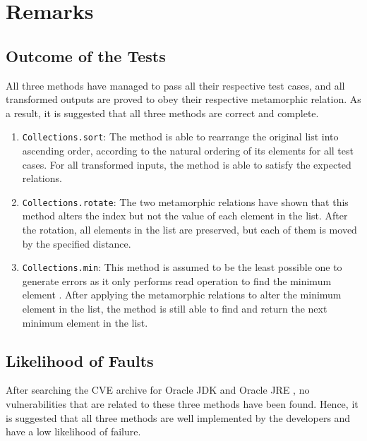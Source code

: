 \documentclass[12pt, a4paper]{article}
\begin{document}
\section{Remarks}
\subsection{Outcome of the Tests}
All three methods have managed to pass all their respective test cases, and all transformed outputs
are proved to obey their respective metamorphic relation. As a result, it is suggested that all
three methods are correct and complete.

\begin{enumerate}
  \item \texttt{Collections.sort}: The method is able to rearrange the original list into ascending
  order, according to the natural ordering of its elements for all test cases. For all transformed
  inputs, the method is able to satisfy the expected relations.

  \item \texttt{Collections.rotate}: The two metamorphic relations have shown that this method
  alters the index but not the value of each element in the list. After the rotation, all elements
  in the list are preserved, but each of them is moved by the specified distance.

  \item \texttt{Collections.min}: This method is assumed to be the least possible one to generate
  errors as it only performs read operation to find the minimum element \cite{collection_min}. After
  applying the metamorphic relations to alter the minimum element in the list, the method is still
  able to find and return the next minimum element in the list.
\end{enumerate}

\subsection{Likelihood of Faults}
After searching the CVE archive for Oracle JDK \cite{jdk_cve} and Oracle JRE \cite{jre_cve}, no
vulnerabilities that are related to these three methods have been found. Hence, it is suggested that
all three methods are well implemented by the developers and have a low likelihood of failure.

\printbibliography
\end{document}
